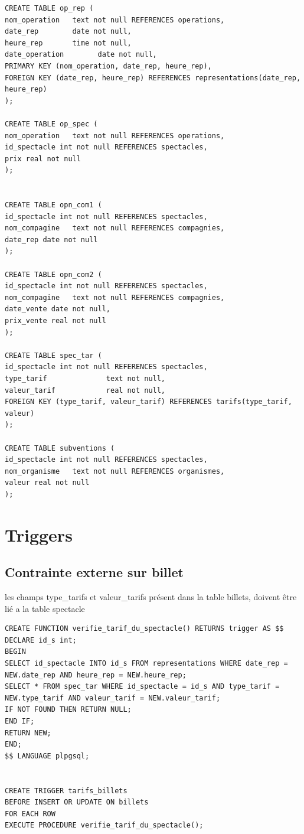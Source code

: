 \documentclass[10pt]{report}
\begin{document}
\begin{lstlisting}
CREATE TABLE op_rep (
nom_operation   text not null REFERENCES operations,
date_rep    	date not null,
heure_rep   	time not null,
date_operation        date not null,
PRIMARY KEY (nom_operation, date_rep, heure_rep),
FOREIGN KEY (date_rep, heure_rep) REFERENCES representations(date_rep, heure_rep)
);

CREATE TABLE op_spec (
nom_operation   text not null REFERENCES operations,
id_spectacle int not null REFERENCES spectacles,
prix real not null
);


CREATE TABLE opn_com1 (
id_spectacle int not null REFERENCES spectacles,
nom_compagine   text not null REFERENCES compagnies,
date_rep date not null
);

CREATE TABLE opn_com2 (
id_spectacle int not null REFERENCES spectacles,
nom_compagine   text not null REFERENCES compagnies,
date_vente date not null,
prix_vente real not null
);

CREATE TABLE spec_tar (
id_spectacle int not null REFERENCES spectacles,
type_tarif	     		text not null,
valeur_tarif    		real not null,
FOREIGN KEY (type_tarif, valeur_tarif) REFERENCES tarifs(type_tarif, valeur)
);

CREATE TABLE subventions (
id_spectacle int not null REFERENCES spectacles,
nom_organisme   text not null REFERENCES organismes,
valeur real not null
);
\end{lstlisting}
\chapter{Triggers}
\section{Contrainte externe sur billet}
les champs type\_tarifs  et valeur\_tarifs présent dans la table billets, doivent être lié a la table spectacle
\begin{lstlisting}
CREATE FUNCTION verifie_tarif_du_spectacle() RETURNS trigger AS $$ 
DECLARE id_s int;
BEGIN
SELECT id_spectacle INTO id_s FROM representations WHERE date_rep = NEW.date_rep AND heure_rep = NEW.heure_rep;
SELECT * FROM spec_tar WHERE id_spectacle = id_s AND type_tarif = NEW.type_tarif AND valeur_tarif = NEW.valeur_tarif;
IF NOT FOUND THEN RETURN NULL;
END IF;
RETURN NEW;
END; 
$$ LANGUAGE plpgsql;


CREATE TRIGGER tarifs_billets
BEFORE INSERT OR UPDATE ON billets
FOR EACH ROW
EXECUTE PROCEDURE verifie_tarif_du_spectacle();
\end{lstlisting}
\end{document}
